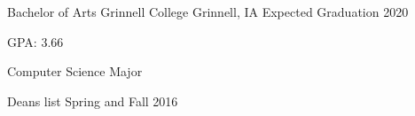 \documentclass[12pt, a4paper]{awesome-cv}
\begin{document}
\makecvheader


\begin{cventries}
  \cventry
    {Bachelor of Arts}
    {Grinnell College}
    {Grinnell, IA}
    {Expected Graduation 2020}
    {
      \begin{cvitems}
        \item{GPA: 3.66}
	\item{Computer Science Major}
        \item {Deans list Spring and Fall 2016}
      \end{cvitems}
    }
\end{cventries}
\end{document}
